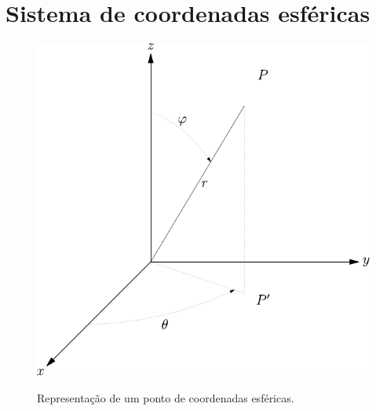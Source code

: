  \section{Sistema de coordenadas esféricas}
\begin{figure}%
\begin{center}
      \includegraphics{./cap_algvet/pics/coordenadas_esfericas}
   \caption{Representação de um ponto de coordenadas esféricas.}\label{./cap_algvet/pics/coo_esf}
      \label{fig:coordenadas_esfericas}
        \end{center}\end{figure}

